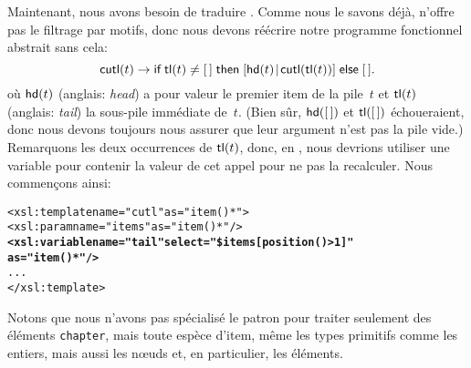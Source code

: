 Maintenant, nous avons besoin de traduire . Comme nous le
savons déjà, \XSLT n'offre pas le filtrage par motifs, donc nous
devons réécrire notre programme fonctionnel abstrait sans cela:
\begin{equation*}
  \textsf{cutl}(t) \rightarrow \textsf{if} \; \textsf{tl}(t) \neq [\,]  \;
  \textsf{then} \; [{\textsf{hd}(t)}\!\mid\!{\textsf{cutl}(\textsf{tl}(t))}] \; \textsf{else} \; [\,].
\end{equation*}
où \(\textsf{hd}(t)\) (anglais: \emph{head})  a
pour valeur le premier item de la pile~\(t\) et \(\textsf{tl}(t)\)
(anglais: \emph{tail})
 la sous-pile immédiate de~\(t\). (Bien sûr,
\(\textsf{hd}([\,])\) et \(\textsf{tl}([\,])\) échoueraient, donc nous
devons toujours nous assurer que leur argument n'est pas la pile
vide.) Remarquons les deux occurrences de \(\textsf{tl}(t)\), donc, en
\XSLT, nous devrions utiliser une variable pour contenir la valeur de
cet appel pour ne pas la recalculer. Nous commençons ainsi:
\begin{alltt}
\small  <xsl:template name="cutl" as="item()*">
    <xsl:param name="items" as="item()*"/>
    \textbf{<xsl:variable name="tail" select="\$items[position()>1]"
                              as="item()*"/>}
    ...
  </xsl:template>
\end{alltt}
Notons que nous n'avons pas spécialisé le patron pour traiter
seulement des éléments \texttt{chapter}, mais toute espèce d'item,
même les types primitifs comme les entiers, mais aussi les nœuds
et, en particulier, les éléments.


